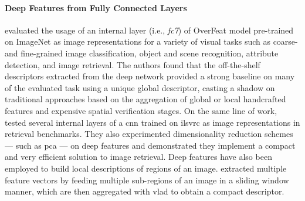 \paragraph{Deep Features from Fully Connected Layers}
\citet{sharif2014cnn} evaluated the usage of an internal layer (i.e., \emph{fc7}) of OverFeat model pre-trained on ImageNet as image representations for a variety of visual tasks such as coarse- and fine-grained image classification, object and scene recognition, attribute detection, and image retrieval.
The authors found that the off-the-shelf descriptors extracted from the deep network provided a strong baseline on many of the evaluated task using a unique global descriptor, casting a shadow on traditional approaches based on the aggregation of global or local handcrafted features and expensive spatial verification stages.
%
On the same line of work, \citet{babenko2014neural} tested several internal layers of a \gls{cnn} trained on \gls{ilsvrc} as image representations in retrieval benchmarks.
They also experimented dimensionality reduction schemes --- such as \gls{pca} --- on deep features and demonstrated they implement a compact and very efficient solution to image retrieval.
%
Deep features have also been employed to build local descriptions of regions of an image.
\citet{gong2014multi} extracted multiple feature vectors by feeding multiple sub-regions of an image in a sliding window manner,  which are then aggregated with \gls{vlad} to obtain a compact descriptor.

